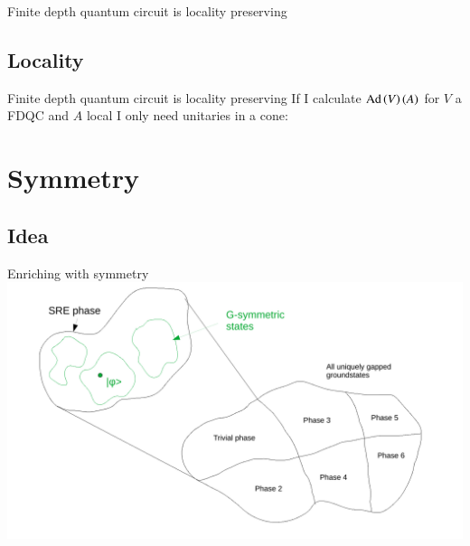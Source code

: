 \documentclass{beamer}
\begin{document}
\begin{frame}{Finite depth quantum circuit is locality preserving}
	\begin{center}
		\scalebox{0.75}{}
	\end{center}
	\pause
	\begin{center}
		\scalebox{0.75}{}
	\end{center}
\end{frame}

\subsection{Locality}

\begin{frame}{Finite depth quantum circuit is locality preserving}
	If I calculate $\textrm{Ad}\left(V\right)(A)$ for $V$ a FDQC and $A$ local I only need unitaries in a cone:
	\begin{center}
		\scalebox{0.75}{
			
		}
	\end{center}
\end{frame}

\section{Symmetry}
\subsection{Idea}

\begin{frame}{Enriching with symmetry}
	\includegraphics[width=\textwidth]{Figures/G-invariant_Parts_Of_SRE_Phase.pdf}
\end{frame}
\end{document}
